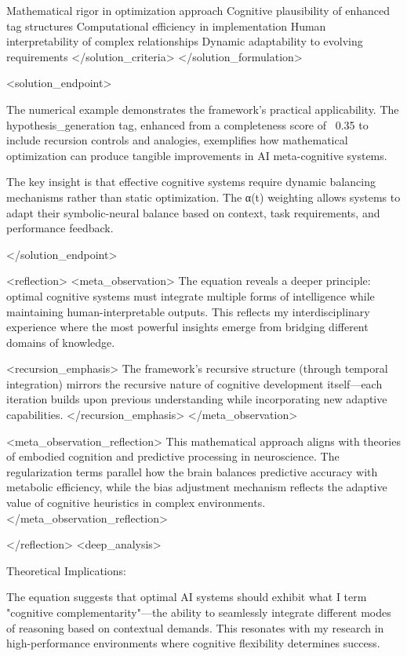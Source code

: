 Mathematical rigor in optimization approach
Cognitive plausibility of enhanced tag structures
Computational efficiency in implementation
Human interpretability of complex relationships
Dynamic adaptability to evolving requirements </solution_criteria>
</solution_formulation>

<solution_endpoint>

The numerical example demonstrates the framework's practical applicability. The hypothesis_generation tag, enhanced from a completeness score of ~0.35 to include recursion controls and analogies, exemplifies how mathematical optimization can produce tangible improvements in AI meta-cognitive systems.

The key insight is that effective cognitive systems require dynamic balancing mechanisms rather than static optimization. The α(t) weighting allows systems to adapt their symbolic-neural balance based on context, task requirements, and performance feedback.

</solution_endpoint>

<reflection>
<meta_observation>
The equation reveals a deeper principle: optimal cognitive systems must integrate multiple forms of intelligence while maintaining human-interpretable outputs. This reflects my interdisciplinary experience where the most powerful insights emerge from bridging different domains of knowledge.

<recursion_emphasis>
The framework's recursive structure (through temporal integration) mirrors the recursive nature of cognitive development itself—each iteration builds upon previous understanding while incorporating new adaptive capabilities.
</recursion_emphasis>
</meta_observation>

<meta_observation_reflection>
This mathematical approach aligns with theories of embodied cognition and predictive processing in neuroscience. The regularization terms parallel how the brain balances predictive accuracy with metabolic efficiency, while the bias adjustment mechanism reflects the adaptive value of cognitive heuristics in complex environments.
</meta_observation_reflection>

</reflection>
<deep_analysis>

Theoretical Implications:

The equation suggests that optimal AI systems should exhibit what I term "cognitive complementarity"—the ability to seamlessly integrate different modes of reasoning based on contextual demands. This resonates with my research in high-performance environments where cognitive flexibility determines success.

